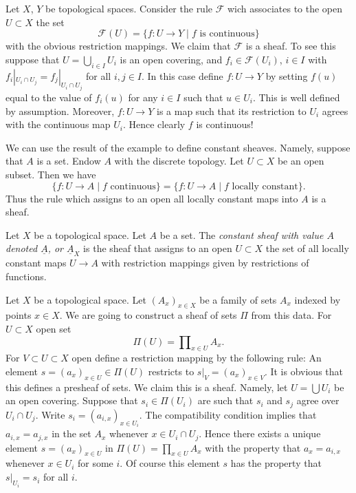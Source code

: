 \begin{example}
\label{example-basic-continuous-maps}
Let $X$, $Y$ be topological spaces.
Consider the rule $\mathcal{F}$ wich associates to
the open $U \subset X$ the set
$$
\mathcal{F}(U) = \{ f : U \to Y \mid f \text{ is continuous}\}
$$
with the obvious restriction mappings. We claim that
$\mathcal{F}$ is a sheaf. To see this suppose that
$U = \bigcup_{i\in I} U_i$ is an open covering, and
$f_i \in \mathcal{F}(U_i)$, $i\in I$ with
$f_i |_{U_i \cap U_j} = f_j|_{U_i \cap U_j}$ for all $i,j \in I$.
In this case define $f : U \to Y$ by setting $f(u)$
equal to the value of $f_i(u)$ for any $i \in I$ such that
$u \in U_i$. This is well defined by assumption. Moreover,
$f : U \to Y$ is a map such that its restriction to $U_i$
agrees with the continuous map $U_i$. Hence clearly $f$ is
continuous!
\end{example}

\noindent
We can use the result of the example to define constant
sheaves. Namely, suppose that $A$ is a set. Endow $A$ with
the discrete topology. Let $U \subset X$ be an open subset.
Then we have
$$
\{ f : U \to A \mid f\text{ continuous}\}
=
\{ f : U \to A \mid f\text{ locally constant}\}.
$$
Thus the rule which assigns to an open all locally
constant maps into $A$ is a sheaf.

\begin{definition}
\label{definition-constant-sheaf}
Let $X$ be a topological space. Let $A$ be a set.
The {\it constant sheaf with value $A$ denoted $\underline{A}$, or
$\underline{A}_X$} is the sheaf that assigns to an open $U \subset X$
the set of all locally constant maps $U \to A$ with restriction mappings
given by restrictions of functions.
\end{definition}

\begin{example}
\label{example-sheaf-product-pointwise}
Let $X$ be a topological space. Let $(A_x)_{x \in X}$ be 
a family of sets $A_x$ indexed by points $x \in X$. We are
going to construct a sheaf of sets $\Pi$ from this data.
For $U \subset X$ open set
$$
\Pi(U) = \prod\nolimits_{x \in U} A_x.
$$
For $V \subset U \subset X$ open define
a restriction mapping by the following rule: An element
$s = (a_x)_{x\in U} \in \Pi(U)$ restricts
to $s|_V = (a_x)_{x \in V}$. It is obvious that this
defines a presheaf of sets. We claim this is a sheaf.
Namely, let $U = \bigcup U_i$ be an open covering.
Suppose that $s_i \in \Pi(U_i)$ are
such that $s_i$ and $s_j$ agree over $U_i \cap U_j$. Write
$s_i = (a_{i,x})_{x\in U_i}$. The compatibility condition implies that
$a_{i, x} = a_{j, x}$ in the set $A_x$ whenever $x \in U_i \cap U_j$. 
Hence there exists a unique element $s = (a_x)_{x\in U}$
in $\Pi(U) = \prod_{x\in U} A_x$ with the property that
$a_x = a_{i, x}$ whenever $x \in U_i$ for some $i$. Of course this
element $s$ has the property that $s|_{U_i} = s_i$ for all $i$.
\end{example}

